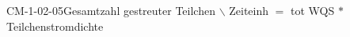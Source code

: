 
\begin{CONC}{CM-1-02-05}{Gesamtzahl gestreuter Teilchen $\backslash$ Zeiteinh $=$ tot WQS $*$ Teilchenstromdichte}
\end{CONC}
